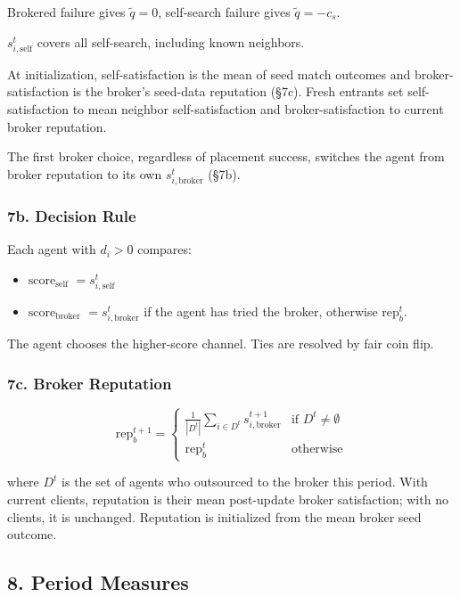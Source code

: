 \documentclass[11pt]{article}
\providecommand{\tightlist}{%
  \setlength{\itemsep}{0pt}\setlength{\parskip}{0pt}}
\begin{document}
Brokered failure gives \(\tilde{q}=0\), self-search failure gives \(\tilde{q}=-c_s\).

\(s_{i,\text{self}}^t\) covers all self-search, including known neighbors.

At initialization, self-satisfaction is the mean of seed match outcomes and broker-satisfaction is the broker's seed-data reputation (§7c). Fresh entrants set self-satisfaction to mean neighbor self-satisfaction and broker-satisfaction to current broker reputation.

The first broker choice, regardless of placement success, switches the agent from broker reputation to its own \(s_{i,\text{broker}}^t\) (§7b).

\subsubsection{7b. Decision Rule}\label{b.-decision-rule}

Each agent with \(d_i > 0\) compares:

\begin{itemize}
\tightlist
\item \textbf{\(\text{score}_{\text{self}}\)} \(= s_{i,\text{self}}^t\)
\item \textbf{\(\text{score}_{\text{broker}}\)} \(= s_{i,\text{broker}}^t\) if the agent has tried the broker, otherwise \(\text{rep}_b^t\).
\end{itemize}

The agent chooses the higher-score channel. Ties are resolved by fair coin flip.

\subsubsection{7c. Broker Reputation}\label{c.-broker-reputation}

\[\text{rep}_b^{t+1} = \begin{cases} \frac{1}{|D^t|} \sum_{i \in D^t} s_{i,\text{broker}}^{t+1} & \text{if } D^t \neq \emptyset \\[4pt] \text{rep}_b^{t} & \text{otherwise} \end{cases}\]

where \(D^t\) is the set of agents who outsourced to the broker this period. With current clients, reputation is their mean post-update broker satisfaction; with no clients, it is unchanged. Reputation is initialized from the mean broker seed outcome.

\subsection{8. Period Measures}\label{period-measures}
\end{document}
